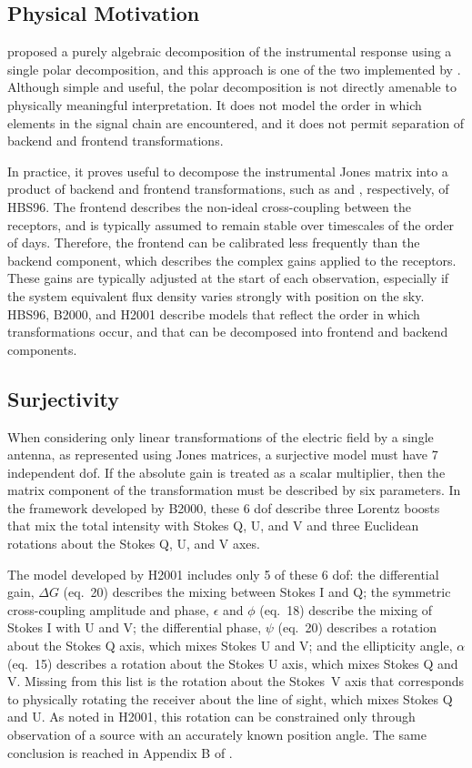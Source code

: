 \subsection{Physical Motivation}

\citet{ham00} proposed a purely algebraic decomposition of the 
instrumental response using a single polar decomposition, and this 
approach is one of the two implemented by \citet{van04c}.
%
Although simple and useful, the polar decomposition is not directly amenable to physically meaningful interpretation.  It does not
model the order in which elements in the signal chain are encountered,
and it does not permit separation of backend and frontend transformations.

In practice, it proves useful to decompose the instrumental Jones matrix
into a product of backend and frontend transformations, such as  and , respectively, of HBS96.
%
The frontend describes the non-ideal cross-coupling between the receptors, and is typically assumed to remain stable over timescales of the order of days.
%
Therefore, the frontend can be calibrated less frequently than the backend component, which describes the complex gains applied to the receptors.  
%
These gains are typically adjusted at the start of each observation,
especially if the system equivalent flux density varies strongly with position on the sky.
%
HBS96, B2000, and H2001 describe models that reflect the order in 
which transformations occur, and that can be decomposed into frontend 
and backend components.

\subsection{Surjectivity}

When considering only linear transformations of the electric field by
a single antenna, as represented using Jones matrices, a surjective
model must have 7 independent dof.
%
If the absolute gain is treated as a scalar multiplier, then the
matrix component of the transformation must be described by six parameters.
%
In the framework developed by B2000, these 6 dof describe
three Lorentz boosts that mix the total intensity with Stokes Q, U, and V
and three Euclidean rotations about the Stokes Q, U, and V axes.

The model developed by H2001 includes only 5 of these 6 dof:
%
the differential gain, $\Delta G$ (eq.~20) describes the mixing between Stokes I and Q;
%
the symmetric cross-coupling amplitude and phase, $\epsilon$ and $\phi$ (eq.~18) describe the mixing of Stokes I with U and V;
%
the differential phase, $\psi$ (eq.~20) describes a rotation about the Stokes Q axis, which mixes Stokes U and V; and
%
the ellipticity angle, $\alpha$ (eq.~15) describes a rotation about the Stokes U axis, which mixes Stokes Q and V.
%
Missing from this list is the rotation about the Stokes~V axis
that corresponds to physically rotating the receiver about the line 
of sight, which mixes Stokes Q and U.
As noted in H2001, this rotation can be constrained only through
observation of a source with an accurately known position angle.
%
The same conclusion is reached in Appendix B of \cite{van04c}.

